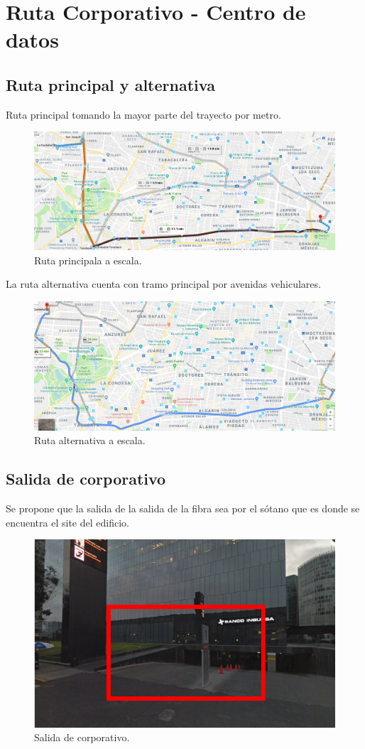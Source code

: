 \documentclass[12pt,letterpaper]{article}
\begin{document}


\newpage
\tableofcontents
\listoffigures

\newpage
\section{Ruta Corporativo - Centro de datos }
\subsection{Ruta principal y alternativa}
Ruta principal tomando la mayor parte del trayecto por metro.
\begin{figure}[ht]
    \centering
    \includegraphics[width=.9\textwidth]{f2.png}
    \caption{Ruta principala a escala.}
\end{figure}

La ruta alternativa cuenta con tramo principal por avenidas 
vehiculares.
\begin{figure}[ht]
    \centering
    \includegraphics[width=.9\textwidth]{f3.png}
    \caption{Ruta alternativa a escala.}
\end{figure}

\newpage
\subsection{Salida de corporativo}
Se propone que la salida de la salida de la fibra sea por el 
sótano que es donde se encuentra el site del edificio.
\begin{figure}[ht]
    \centering
    \includegraphics[width=.6\textwidth]{f0.png}
    \caption{Salida de corporativo.}
\end{figure}
\end{document}
